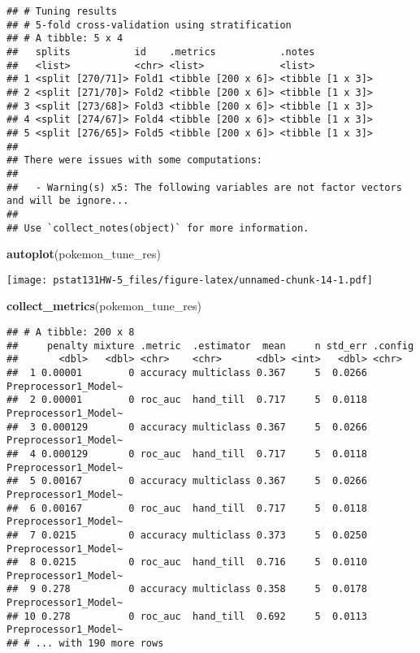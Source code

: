 \documentclass[]{article}
\newenvironment{Shaded}{\begin{snugshade}}{\end{snugshade}}
\newcommand{\KeywordTok}[1]{\textcolor[rgb]{0.13,0.29,0.53}{\textbf{#1}}}
\newcommand{\NormalTok}[1]{#1}
\begin{document}
\begin{verbatim}
## # Tuning results
## # 5-fold cross-validation using stratification 
## # A tibble: 5 x 4
##   splits           id    .metrics           .notes          
##   <list>           <chr> <list>             <list>          
## 1 <split [270/71]> Fold1 <tibble [200 x 6]> <tibble [1 x 3]>
## 2 <split [271/70]> Fold2 <tibble [200 x 6]> <tibble [1 x 3]>
## 3 <split [273/68]> Fold3 <tibble [200 x 6]> <tibble [1 x 3]>
## 4 <split [274/67]> Fold4 <tibble [200 x 6]> <tibble [1 x 3]>
## 5 <split [276/65]> Fold5 <tibble [200 x 6]> <tibble [1 x 3]>
## 
## There were issues with some computations:
## 
##   - Warning(s) x5: The following variables are not factor vectors and will be ignore...
## 
## Use `collect_notes(object)` for more information.
\end{verbatim}

\begin{Shaded}
\begin{Highlighting}[]
\KeywordTok{autoplot}\NormalTok{(pokemon_tune_res)}
\end{Highlighting}
\end{Shaded}

\texttt{[image: pstat131HW-5\_files/figure-latex/unnamed-chunk-14-1.pdf]}

\begin{Shaded}
\begin{Highlighting}[]
\KeywordTok{collect_metrics}\NormalTok{(pokemon_tune_res)}
\end{Highlighting}
\end{Shaded}

\begin{verbatim}
## # A tibble: 200 x 8
##     penalty mixture .metric  .estimator  mean     n std_err .config             
##       <dbl>   <dbl> <chr>    <chr>      <dbl> <int>   <dbl> <chr>               
##  1 0.00001        0 accuracy multiclass 0.367     5  0.0266 Preprocessor1_Model~
##  2 0.00001        0 roc_auc  hand_till  0.717     5  0.0118 Preprocessor1_Model~
##  3 0.000129       0 accuracy multiclass 0.367     5  0.0266 Preprocessor1_Model~
##  4 0.000129       0 roc_auc  hand_till  0.717     5  0.0118 Preprocessor1_Model~
##  5 0.00167        0 accuracy multiclass 0.367     5  0.0266 Preprocessor1_Model~
##  6 0.00167        0 roc_auc  hand_till  0.717     5  0.0118 Preprocessor1_Model~
##  7 0.0215         0 accuracy multiclass 0.373     5  0.0250 Preprocessor1_Model~
##  8 0.0215         0 roc_auc  hand_till  0.716     5  0.0110 Preprocessor1_Model~
##  9 0.278          0 accuracy multiclass 0.358     5  0.0178 Preprocessor1_Model~
## 10 0.278          0 roc_auc  hand_till  0.692     5  0.0113 Preprocessor1_Model~
## # ... with 190 more rows
\end{verbatim}
\end{document}
